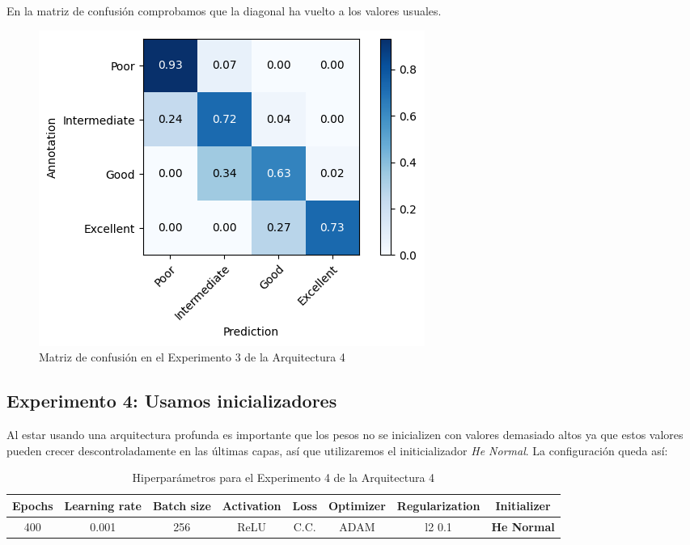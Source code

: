 \documentclass{article}
\begin{document}
			En la matriz de confusi\'on comprobamos que la diagonal ha vuelto a los valores usuales.
			\begin{figure}[!h]
				\begin{center}
					\includegraphics[scale=0.7]{d-cm-a4-e3.png}		
					\caption{Matriz de confusi\'on en el Experimento 3 de la Arquitectura 4}	
					\label{d-cm-a4-e3}
				\end{center}
			\end{figure}
			
			
		\subsection{Experimento 4: Usamos inicializadores}
        \label{s-a4-e4}
			Al estar usando una arquitectura profunda es importante que los pesos no se inicializen con valores demasiado altos ya que estos valores pueden crecer descontroladamente en las \'ultimas capas, as\'i que utilizaremos el initicializador \textit{He Normal}. La configuraci\'on queda as\'i:
			
			\begin{table}[!h]
				\begin{tabular}{|c|c|c|c|c|c|c|c|}
					\textbf{Epochs}&\textbf{Learning rate}&\textbf{Batch size}&\textbf{Activation}&\textbf{Loss}&\textbf{Optimizer}&\textbf{Regularization}  & \textbf{Initializer} \\ \hline
					400 & 0.001 & 256 & ReLU & C.C. & ADAM & l2 0.1 & \textbf{He Normal}
				\end{tabular}
				\caption{Hiperpar\'ametros para el Experimento 4 de la Arquitectura 4}
				\label{tab:hip-d-a4-e4}
			\end{table}
            \newpage
            			
\end{document}
